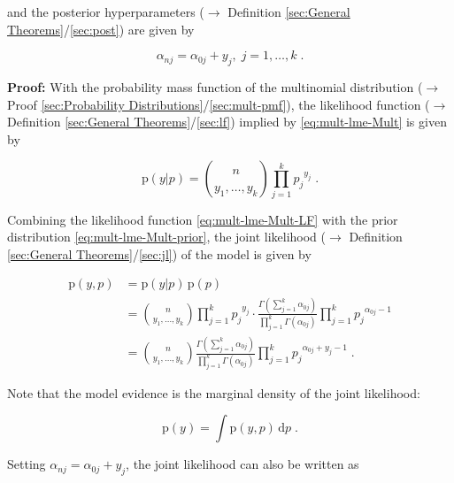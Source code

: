 \documentclass[a4paper,12pt,twoside]{book}
\begin{document}
and the posterior hyperparameters ($\rightarrow$ Definition \ref{sec:General Theorems}/\ref{sec:post}) are given by

\begin{equation} \label{eq:mult-lme-Mult-post-par}
\alpha_{nj} = \alpha_{0j} + y_j, \; j = 1,\ldots,k \; .
\end{equation}


\vspace{1em}
\textbf{Proof:} With the probability mass function of the multinomial distribution ($\rightarrow$ Proof \ref{sec:Probability Distributions}/\ref{sec:mult-pmf}), the likelihood function ($\rightarrow$ Definition \ref{sec:General Theorems}/\ref{sec:lf}) implied by \eqref{eq:mult-lme-Mult} is given by

\begin{equation} \label{eq:mult-lme-Mult-LF}
\mathrm{p}(y|p) = {n \choose {y_1, \ldots, y_k}} \prod_{j=1}^{k} {p_j}^{y_j} \; .
\end{equation}

Combining the likelihood function \eqref{eq:mult-lme-Mult-LF} with the prior distribution \eqref{eq:mult-lme-Mult-prior}, the joint likelihood ($\rightarrow$ Definition \ref{sec:General Theorems}/\ref{sec:jl}) of the model is given by

\begin{equation} \label{eq:mult-lme-Mult-JL}
\begin{split}
\mathrm{p}(y,p) &= \mathrm{p}(y|p) \, \mathrm{p}(p) \\
&= {n \choose {y_1, \ldots, y_k}} \prod_{j=1}^{k} {p_j}^{y_j} \cdot \frac{\Gamma \left( \sum_{j=1}^{k} \alpha_{0j} \right)}{\prod_{j=1}^k \Gamma(\alpha_{0j})} \prod_{j=1}^{k} {p_j}^{\alpha_{0j}-1} \\
&= {n \choose {y_1, \ldots, y_k}} \frac{\Gamma \left( \sum_{j=1}^{k} \alpha_{0j} \right)}{\prod_{j=1}^k \Gamma(\alpha_{0j})} \prod_{j=1}^{k} {p_j}^{\alpha_{0j}+y_j-1} \; .
\end{split}
\end{equation}

Note that the model evidence is the marginal density of the joint likelihood:

\begin{equation} \label{eq:mult-lme-Mult-ME-s1}
\mathrm{p}(y) = \int \mathrm{p}(y,p) \, \mathrm{d}p \; .
\end{equation}

Setting $\alpha_{nj} = \alpha_{0j} + y_j$, the joint likelihood can also be written as
\end{document}
